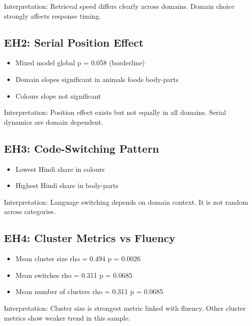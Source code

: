 Interpretation: Retrieval speed differs clearly across domains. Domain
choice strongly affects response timing.

\subsection{EH2: Serial Position
Effect}\label{eh2-serial-position-effect}

\begin{itemize}
\tightlist
\item
  Mixed model global p = 0.058 (borderline)
\item
  Domain slopes significant in animals foods body-parts
\item
  Colours slope not significant
\end{itemize}

Interpretation: Position effect exists but not equally in all domains.
Serial dynamics are domain dependent.

\subsection{EH3: Code-Switching
Pattern}\label{eh3-code-switching-pattern}

\begin{itemize}
\tightlist
\item
  Lowest Hindi share in colours
\item
  Highest Hindi share in body-parts
\end{itemize}

Interpretation: Language switching depends on domain context. It is not
random across categories.

\subsection{EH4: Cluster Metrics vs
Fluency}\label{eh4-cluster-metrics-vs-fluency}

\begin{itemize}
\tightlist
\item
  Mean cluster size rho = 0.494 p = 0.0026
\item
  Mean switches rho = 0.311 p = 0.0685
\item
  Mean number of clusters rho = 0.311 p = 0.0685
\end{itemize}

Interpretation: Cluster size is strongest metric linked with fluency.
Other cluster metrics show weaker trend in this sample.

